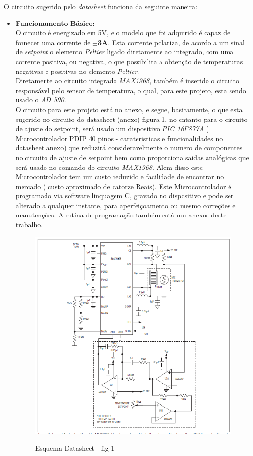 O circuito sugerido pelo \emph{datasheet} funciona da seguinte maneira: \\
\begin{itemize}
\item \textbf{Funcionamento Básico:}\\

O circuito é energizado em 5V, e o modelo que foi adquirido é capaz de fornecer uma corrente de \textbf{$ \pm $3A}. Esta corrente polariza, de acordo a um sinal de \emph{setpoint} o elemento \emph{Peltier} ligado diretamente ao integrado, com uma corrente positiva, ou negativa, o que possibilita a obtenção de temperaturas negativas e positivas no elemento \emph{Peltier}. \\
Diretamente ao circuito integrado \emph{MAX1968}, também é inserido o circuito responsável pelo sensor de temperatura, o qual, para este projeto, esta sendo usado o \emph{AD 590}.\\
O circuito para este projeto está no anexo, e segue, basicamente, o que esta sugerido no circuito do datasheet (anexo) figura 1, no entanto para o circuito de ajuste do setpoint, será usado um dispositivo \emph{PIC 16F877A} ( Microcontrolador PDIP 40 pinos - carateristicas e funcionalidades no datasheet anexo) que reduzirá consideravelmente o numero de componentes no circuito de ajuste de setpoint bem como proporciona saidas analógicas que será usado no comando do circuito \emph{MAX1968}. Alem disso este Microcontrolador tem um custo reduzido e facilidade de encontrar no mercado ( custo aproximado de catorze Reais).
Este Microcontrolador é programado via software linquagem C, gravado no  dispositivo e pode ser alterado a qualquer instante, para aperfeiçoamento ou mesmo correções e manutenções. A rotina de programação também está nos anexos deste trabalho. \\

\begin{figure}[H]
		\centering
		\includegraphics[width=0.7\linewidth]{./ima/esquemaDataSheet01.png}
		\label{fig:esq DataSheet}
		\caption{Esquema Datasheet - fig 1}
	\end{figure}


\end{itemize}
